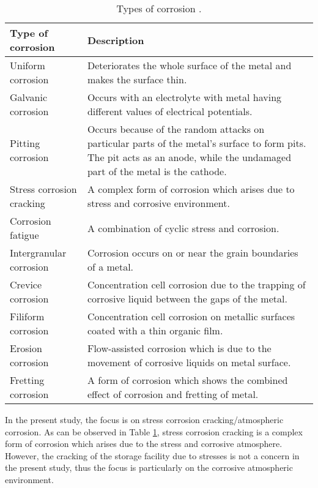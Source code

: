 \begin{table}[H]
\caption{Types of corrosion \cite{chigondo2016recent}.}

\centering
\renewcommand{\arraystretch}{2}
\begin{tabularx}{\textwidth}{>{\hsize=0.65\hsize}X >{\hsize=1.35\hsize}X}
    \hline
    Type of corrosion & Description \\
    \hline
    Uniform corrosion & Deteriorates the whole surface of the metal and makes the surface thin. \\
    Galvanic corrosion & Occurs with an electrolyte with metal having different values of electrical potentials. \\
    Pitting corrosion & Occurs because of the random attacks on particular parts of the metal's surface to form pits. The pit acts as an anode, while the undamaged part of the metal is the cathode. \\
    Stress corrosion cracking & A complex form of corrosion which arises due to stress and  corrosive environment. \\
    Corrosion fatigue & A combination of cyclic stress and corrosion.  \\
    Intergranular corrosion & Corrosion occurs on or near the grain boundaries of a metal.  \\
    Crevice corrosion & Concentration cell corrosion due to the trapping of corrosive liquid  between the gaps of the metal. \\
    Filiform corrosion & Concentration cell corrosion on metallic surfaces coated with a thin  organic film. \\
    Erosion corrosion & Flow-assisted corrosion which is due to the movement of corrosive  liquids on metal surface. \\
    Fretting corrosion & A form of corrosion which shows the combined effect of corrosion and  fretting of metal. \\
    \hline
\end{tabularx}

\label{ch3:table:corrosions}
\end{table}

In the present study, the focus is on stress corrosion cracking/atmospheric corrosion. As can be observed in Table \ref{ch3:table:corrosions}, stress corrosion cracking is a complex form of corrosion which arises due to the stress and corrosive atmosphere. However, the cracking of the storage facility due to stresses is not a concern in the present study, thus the focus is particularly on the corrosive atmospheric environment.

